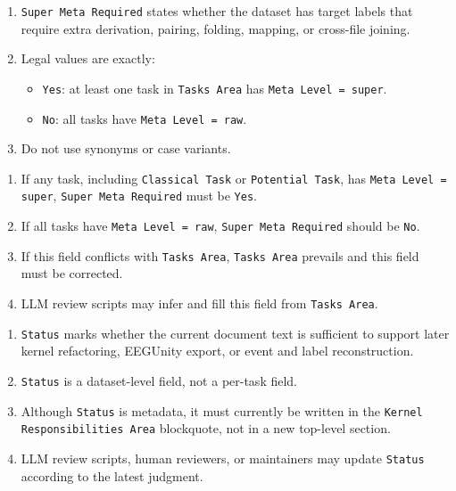 \begin{tcolorbox}
\smallskip{}\par\smallskip

\begin{enumerate}[leftmargin=1.5em,noitemsep,topsep=2pt]
\item \texttt{Super Meta Required} states whether the dataset has target labels that require extra derivation, pairing, folding, mapping, or cross-file joining.
\item Legal values are exactly:
\begin{itemize}[leftmargin=1.2em,noitemsep,topsep=1pt]
\item \texttt{Yes}: at least one task in \texttt{Tasks Area} has \texttt{Meta Level = super}.
\item \texttt{No}: all tasks have \texttt{Meta Level = raw}.
\end{itemize}
\item Do not use synonyms or case variants.
\end{enumerate}

\smallskip{}\par\smallskip

\begin{enumerate}[leftmargin=1.5em,noitemsep,topsep=2pt]
\item If any task, including \texttt{Classical Task} or \texttt{Potential Task}, has \texttt{Meta Level = super}, \texttt{Super Meta Required} must be \texttt{Yes}.
\item If all tasks have \texttt{Meta Level = raw}, \texttt{Super Meta Required} should be \texttt{No}.
\item If this field conflicts with \texttt{Tasks Area}, \texttt{Tasks Area} prevails and this field must be corrected.
\item LLM review scripts may infer and fill this field from \texttt{Tasks Area}.
\end{enumerate}

\smallskip{}\par\smallskip

\begin{enumerate}[leftmargin=1.5em,noitemsep,topsep=2pt]
\item \texttt{Status} marks whether the current document text is sufficient to support later kernel refactoring, EEGUnity export, or event and label reconstruction.
\item \texttt{Status} is a dataset-level field, not a per-task field.
\item Although \texttt{Status} is metadata, it must currently be written in the \texttt{Kernel Responsibilities Area} blockquote, not in a new top-level section.
\item LLM review scripts, human reviewers, or maintainers may update \texttt{Status} according to the latest judgment.
\end{enumerate}


\end{tcolorbox}
